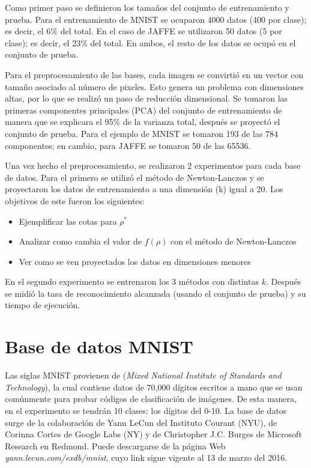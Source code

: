 Como primer paso se definieron los tamaños del conjunto de entrenamiento y prueba. Para el entrenamiento de MNIST se ocuparon 4000 datos (400 por clase); es decir, el 6\% del total. En el caso de JAFFE se utilizaron 50 datos (5 por clase); es decir, el 23\% del total. En ambos, el resto de los datos se ocupó en el conjunto de prueba. 

Para el preprocesamiento de las bases, cada imagen se convirtió en un vector con tamaño asociado al número de pixeles. Esto genera un problema con dimensiones altas, por lo que se realizó un paso de reducción dimensional. Se tomaron las primeras componentes principales (PCA) del conjunto de entrenamiento de manera que se explicara el 95\% de la varianza total, después se proyectó el conjunto de prueba. Para el ejemplo de MNIST se tomaron 193 de las 784 componentes; en cambio, para JAFFE se tomaron 50 de las 65536. 

Una vez hecho el preprocesamiento, se realizaron 2 experimentos para cada base de datos. Para el primero se utilizó el método de Newton-Lanczos y se proyectaron los datos de entrenamiento a una dimensión (k) igual a 20. Los objetivos de este fueron los siguientes: 

\begin{itemize}
\item Ejemplificar las cotas para $\rho^*$
\item Analizar como cambia el valor de $f(\rho)$ con el método de Newton-Lanczos
\item Ver como se ven proyectados los datos en dimensiones menores
\end{itemize}

En el segundo experimento se entrenaron los 3 métodos con distintas $k$. Después se midió la tasa de reconocimiento alcanzada (usando el conjunto de prueba) y su tiempo de ejecución. 

\section{Base de datos MNIST}

Las siglas MNIST provienen de (\textit{Mixed National Institute of Standards and Technology}), la cual contiene datos de 70,000 dígitos escritos a mano que se usan comúnmente para probar códigos de clasificación de imágenes. De esta manera, en el experimento se tendrán 10 clases: los dígitos del 0-10. La base de datos surge de la colaboración de Yann LeCun del Instituto Courant (NYU), de Corinna Cortes de Google Labs (NY) y de Christopher J.C. Burges de Microsoft Research en Redmond. Puede descargarse de la página Web \textit{yann.lecun.com/exdb/mnist}, cuyo link sigue vigente al 13 de marzo del 2016.

